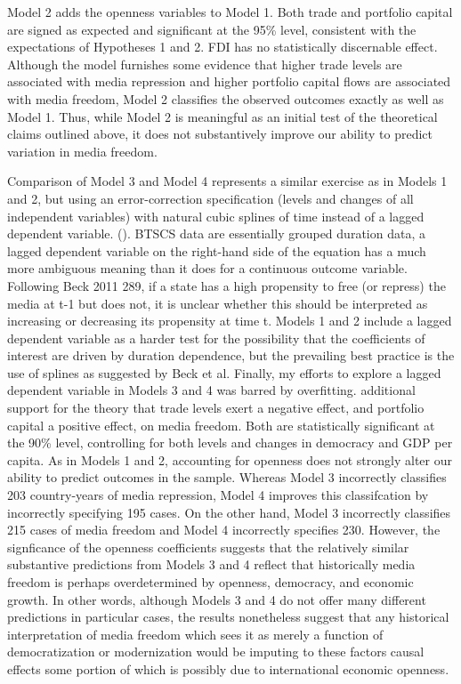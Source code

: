 \documentclass[12pt]{report}
\begin{document}
Model 2 adds the openness variables to Model 1. Both trade and portfolio capital are signed as
expected and significant at the 95\% level, consistent with the expectations of Hypotheses 1 and 2.
FDI has no statistically discernable effect. Although the model furnishes some evidence that higher
trade levels are associated with media repression and higher portfolio capital flows are associated
with media freedom, Model 2 classifies the observed outcomes exactly as well as Model 1. Thus, while
Model 2 is meaningful as an initial test of the theoretical claims outlined above, it does not
substantively improve our ability to predict variation in media freedom.

Comparison of Model 3 and Model 4 represents a similar exercise as in Models 1 and 2, but using an
error-correction specification (levels and changes of all independent variables) with natural cubic
splines of time instead of a lagged dependent variable. (\citealt{Beck:1998wg}).%
BTSCS data are essentially grouped duration data, a lagged dependent variable on the right-hand side
of the equation has a much more ambiguous meaning than it does for a continuous outcome variable.
Following Beck 2011 289, if a state has a high propensity to free (or repress) the media at t-1 but
does not, it is unclear whether this should be interpreted as increasing or decreasing its
propensity at time t. Models 1 and 2 include a lagged dependent variable as a harder test for the
possibility that the coefficients of interest are driven by duration dependence, but the prevailing
best practice is the use of splines as suggested by Beck et al. Finally, my efforts to explore a
lagged dependent variable in Models 3 and 4 was barred by overfitting.%
additional support for the theory that trade levels exert a negative effect, and portfolio capital a
positive effect, on media freedom. Both are statistically significant at the 90\% level, controlling
for both levels and changes in democracy and GDP per capita. As in Models 1 and 2, accounting for
openness does not strongly alter our ability to predict outcomes in the sample. Whereas Model 3
incorrectly classifies 203 country-years of media repression, Model 4 improves this classifcation by
incorrectly specifying 195 cases. On the other hand, Model 3 incorrectly classifies 215 cases of
media freedom and Model 4 incorrectly specifies 230. However, the signficance of the openness
coefficients suggests that the relatively similar substantive predictions from Models 3 and 4
reflect that historically media freedom is perhaps overdetermined by openness, democracy, and
economic growth. In other words, although Models 3 and 4 do not offer many different predictions in
particular cases, the results nonetheless suggest that any historical interpretation of media
freedom which sees it as merely a function of democratization or modernization would be imputing to
these factors causal effects some portion of which is possibly due to international economic
openness.
\end{document}
